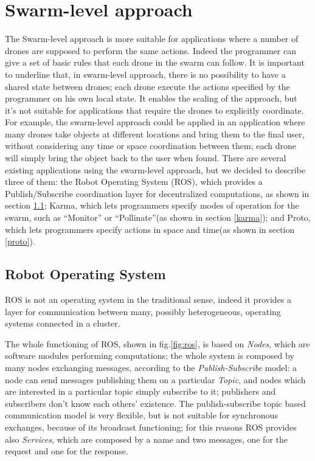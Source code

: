 \section{Swarm-level approach}\label{swarmLevel}

The Swarm-level approach is more suitable for applications where a number of drones are supposed to perform the same actions. Indeed the programmer can give a set of basic rules that each drone in the swarm can follow.
It is important to underline that, in swarm-level approach, there is no possibility to have a shared state between drones; each drone execute the actions specified by the programmer on his own local state.
It enables the scaling of the approach, but it's not suitable for applications that require the drones to explicitly coordinate.
For example, the swarm-level approach could be applied in an application where many drones take objects at different locations and bring them to the final user, without considering any time or space coordination between them; each drone will simply bring the object back to the user when found.  
There are several existing applications using the swarm-level approach, but we decided to describe three of them:
the Robot Operating System (ROS)\cite{ros}, which provides a Publish/Subscribe coordination layer for decentralized computations, as shown in section \ref{ros}; Karma\cite{karma}, which lets programmers specify modes of operation for the swarm, such as “Monitor” or “Pollinate”(as shown in section \ref{karma}); and Proto\cite{proto}, which lets programmers specify actions in space and time(as shown in section \ref{proto}). 

\subsection{Robot Operating System}\label{ros}

ROS\cite{ros} is not an operating system in the traditional sense, indeed it provides a layer for communication between many, possibly heterogeneous, operating systems connected in a cluster.

The whole functioning of ROS, shown in fig.\ref{fig:ros}, is based on \textit{Nodes}, which are software modules performing computations; the whole system is composed by many nodes exchanging messages, according to the \textit{Publish-Subscribe} model:
a node can send messages publishing them on a particular \textit{Topic}, and nodes which are interested in a particular topic simply subscribe to it; publishers and subscribers don't know each others' existence.
The publish-subscribe topic based communication model is very flexible, but is not suitable for synchronous exchanges, because of its broadcast functioning; for this reasons ROS provides also \textit{Services}, which are composed by a name and two messages, one for the request and one for the response.





